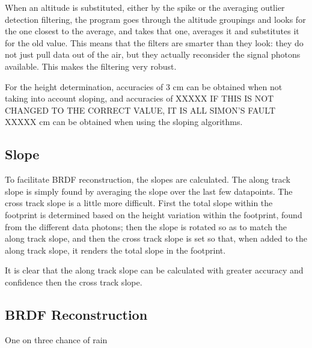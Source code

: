 When an altitude is substituted, either by the spike or the averaging outlier detection filtering, the program goes through the altitude groupings and looks for the one closest to the average, and takes that one, averages it and substitutes it for the old value. This means that the filters are smarter than they look: they do not just pull data out of the air, but they actually reconsider the signal photons available. This makes the filtering very robust.

For the height determination, accuracies of 3 cm can be obtained when not taking into account sloping, and accuracies of XXXXX IF THIS IS NOT CHANGED TO THE CORRECT VALUE, IT IS ALL SIMON'S FAULT XXXXX cm can be obtained when using the sloping algorithms. 

\subsection{Slope}
\label{sec:Slope}
To facilitate BRDF reconstruction, the slopes are calculated. The along track slope is simply found by averaging the slope over the last few datapoints. The cross track slope is a little more difficult. First the total slope within the footprint is determined based on the height variation within the footprint, found from the different data photons; then the slope is rotated so as to match the along track slope, and then the cross track slope is set so that, when added to the along track slope, it renders the total slope in the footprint.

It is clear that the along track slope can be calculated with greater accuracy and confidence then the cross track slope.

\subsection{BRDF Reconstruction}
\label{sec:BRDFReconstuction}



One on three chance of rain


